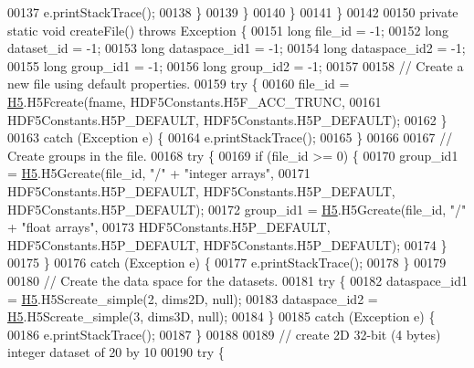 \begin{DoxyCode}
00137                     e.printStackTrace();
00138                 \}
00139             \}
00140         \}
00141     \}
00142 
00150     \textcolor{keyword}{private} \textcolor{keyword}{static} \textcolor{keywordtype}{void} createFile() \textcolor{keywordflow}{throws} Exception \{
00151         \textcolor{keywordtype}{long} file\_id = -1;
00152         \textcolor{keywordtype}{long} dataset\_id = -1;
00153         \textcolor{keywordtype}{long} dataspace\_id1 = -1;
00154         \textcolor{keywordtype}{long} dataspace\_id2 = -1;
00155         \textcolor{keywordtype}{long} group\_id1 = -1;
00156         \textcolor{keywordtype}{long} group\_id2 = -1;
00157 
00158         \textcolor{comment}{// Create a new file using default properties.}
00159         \textcolor{keywordflow}{try} \{
00160             file\_id = \hyperlink{namespace_h5}{H5}.H5Fcreate(fname, HDF5Constants.H5F\_ACC\_TRUNC,
00161                     HDF5Constants.H5P\_DEFAULT, HDF5Constants.H5P\_DEFAULT);
00162         \}
00163         \textcolor{keywordflow}{catch} (Exception e) \{
00164             e.printStackTrace();
00165         \}
00166 
00167         \textcolor{comment}{// Create groups in the file.}
00168         \textcolor{keywordflow}{try} \{
00169             \textcolor{keywordflow}{if} (file\_id >= 0) \{
00170                 group\_id1 = \hyperlink{namespace_h5}{H5}.H5Gcreate(file\_id, \textcolor{stringliteral}{"/"} + \textcolor{stringliteral}{"integer arrays"},
00171                         HDF5Constants.H5P\_DEFAULT, HDF5Constants.H5P\_DEFAULT, HDF5Constants.H5P\_DEFAULT);
00172                 group\_id1 = \hyperlink{namespace_h5}{H5}.H5Gcreate(file\_id, \textcolor{stringliteral}{"/"} + \textcolor{stringliteral}{"float arrays"},
00173                         HDF5Constants.H5P\_DEFAULT, HDF5Constants.H5P\_DEFAULT, HDF5Constants.H5P\_DEFAULT);
00174             \}
00175         \}
00176         \textcolor{keywordflow}{catch} (Exception e) \{
00177             e.printStackTrace();
00178         \}
00179 
00180         \textcolor{comment}{// Create the data space for the datasets.}
00181         \textcolor{keywordflow}{try} \{
00182             dataspace\_id1 = \hyperlink{namespace_h5}{H5}.H5Screate\_simple(2, dims2D, null);
00183             dataspace\_id2 = \hyperlink{namespace_h5}{H5}.H5Screate\_simple(3, dims3D, null);
00184         \}
00185         \textcolor{keywordflow}{catch} (Exception e) \{
00186             e.printStackTrace();
00187         \}
00188 
00189         \textcolor{comment}{// create 2D 32-bit (4 bytes) integer dataset of 20 by 10}
00190         \textcolor{keywordflow}{try} \{

\end{DoxyCode}
